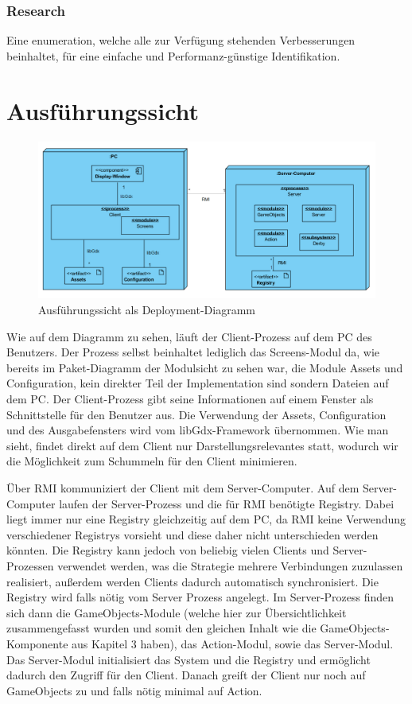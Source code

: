 \documentclass[fontsize=12pt,paper=a4,twoside]{scrartcl}
\begin{document}
\subsubsection{Research}

Eine enumeration, welche alle zur Verfügung stehenden Verbesserungen beinhaltet, für eine einfache und Performanz-günstige Identifikation.


\section{Ausführungssicht}

\label{sec:ausfuehrung}

\begin{figure}[h]
\centering
\includegraphics[width=1.0\linewidth]{Deployment}
\caption{Ausführungssicht als Deployment-Diagramm}
\label{fig:Deployment}
\end{figure}

Wie auf dem Diagramm zu sehen, läuft der Client-Prozess auf dem PC des Benutzers. Der Prozess selbst beinhaltet lediglich das Screens-Modul da, wie bereits im Paket-Diagramm der Modulsicht zu sehen war, die Module Assets und Configuration, kein direkter Teil der Implementation sind sondern Dateien auf dem PC. Der Client-Prozess gibt seine Informationen auf einem Fenster als Schnittstelle für den Benutzer aus. Die Verwendung der Assets, Configuration und des Ausgabefensters wird vom libGdx-Framework übernommen. Wie man sieht, findet direkt auf dem Client nur Darstellungsrelevantes statt, wodurch wir die Möglichkeit zum Schummeln für den Client minimieren.

Über RMI kommuniziert der Client mit dem Server-Computer. Auf dem Server-Computer laufen der Server-Prozess und die für RMI benötigte Registry. Dabei liegt immer nur eine Registry gleichzeitig auf dem PC, da RMI keine Verwendung verschiedener Registrys vorsieht und diese daher nicht unterschieden werden könnten. Die Registry kann jedoch von beliebig vielen Clients und Server-Prozessen verwendet werden, was die Strategie mehrere Verbindungen zuzulassen realisiert, außerdem werden Clients dadurch automatisch synchronisiert. Die Registry wird falls nötig vom Server Prozess angelegt. Im Server-Prozess finden sich dann die GameObjects-Module (welche hier zur Übersichtlichkeit zusammengefasst wurden und somit den gleichen Inhalt wie die GameObjects-Komponente aus Kapitel 3 haben), das Action-Modul, sowie das Server-Modul. Das Server-Modul initialisiert das System und die Registry und ermöglicht dadurch den Zugriff für den Client. Danach greift der Client nur noch auf GameObjects zu und falls nötig minimal auf Action. 
\end{document}

